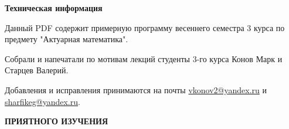 \begin{center}
	{\Large \textbf{Техническая информация}}
\end{center}

\vspace{0.5cm}
Данный PDF содержит примерную программу весеннего семестра 3 курса по предмету "Актуарная математика".

\vspace{0.5cm}
Собрали и напечатали по мотивам лекций студенты 3-го курса Конов Марк и Старцев Валерий.

\vspace{0.5cm}
Добавления и исправления принимаются на почты \href{}{vkonov2@yandex.ru} и \href{}{sharfikeg@yandex.ru}.

\vspace{0.5cm}
\begin{center}
	{\Large \textbf{ПРИЯТНОГО ИЗУЧЕНИЯ}}
\end{center}

\newpage

